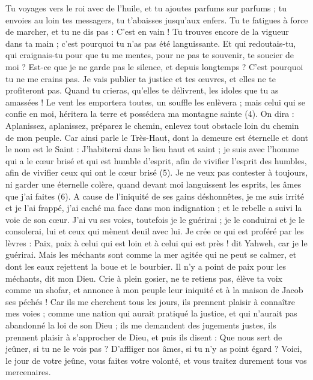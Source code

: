 \begin{multicols}{2}
Tu voyages vers le roi avec de l’huile, et tu ajoutes parfums sur parfums ; tu envoies au loin tes messagers, tu t’abaisses jusqu'aux enfers.
Tu te fatigues à force de marcher, et tu ne dis pas : C’est en vain ! Tu trouves encore de la vigueur dans ta main ; c’est pourquoi tu n'as pas été languissante.
Et qui redoutais-tu, qui craignais-tu pour que tu me mentes, pour ne pas te souvenir, te soucier de moi ? Est-ce que je ne garde pas le silence, et depuis longtemps ? C’est pourquoi tu ne me crains pas.
Je vais publier ta justice et tes œuvres, et elles ne te profiteront pas.
Quand tu crieras, qu’elles te délivrent, les idoles que tu as amassées ! Le vent les emportera toutes, un souffle les enlèvera ; mais celui qui se confie en moi, héritera la terre et possédera ma montagne sainte (4).
On dira : Aplanissez, aplanissez, préparez le chemin, enlevez tout obstacle loin du chemin de mon peuple.
Car ainsi parle le Très-Haut, dont la demeure est éternelle et dont le nom est le Saint : J'habiterai dans le lieu haut et saint ; je suis avec l’homme qui a le cœur brisé et qui est humble d'esprit, afin de vivifier l'esprit des humbles, afin de vivifier ceux qui ont le cœur brisé (5).
Je ne veux pas contester à toujours, ni garder une éternelle colère, quand devant moi languissent les esprits, les âmes que j’ai faites (6).
A cause de l'iniquité de ses gains déshonnêtes, je me suis irrité et je l’ai frappé, j’ai caché ma face dans mon indignation ; et le rebelle a suivi la voie de son cœur.
J'ai vu ses voies, toutefois je le guérirai ; je le conduirai et je le consolerai, lui et ceux qui mènent deuil avec lui.
Je crée ce qui est proféré par les lèvres : Paix, paix à celui qui est loin et à celui qui est près ! dit Yahweh, car je le guérirai.
Mais les méchants sont comme la mer agitée qui ne peut se calmer, et dont les eaux rejettent la boue et le bourbier.
Il n'y a point de paix pour les méchants, dit mon Dieu.
\VerseOne{}Crie à plein gosier, ne te retiens pas, élève ta voix comme un shofar, et annonce à mon peuple leur iniquité et à la maison de Jacob ses péchés !
Car ils me cherchent tous les jours, ils prennent plaisir à connaître mes voies ; comme une nation qui aurait pratiqué la justice, et qui n'aurait pas abandonné la loi de son Dieu ; ils me demandent des jugements justes, ils prennent plaisir à s’approcher de Dieu, et puis ils disent :
Que nous sert de jeûner, si tu ne le vois pas ? D’affliger nos âmes, si tu n’y as point égard ? Voici, le jour de votre jeûne, vous faites votre volonté, et vous traitez durement tous vos mercenaires.

\end{multicols}

